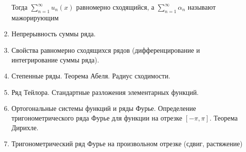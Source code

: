 \documentclass[12pt]{article}
\begin{document}
\begin{enumerate}
    Тогда $\sum_{n = 1}^\infty u_n(x)$ равномерно сходящийся, а $\sum_{n = 1}^\infty \alpha_n$ называют мажорирующим

    \item Непрерывность суммы ряда.
    \item Свойства равномерно сходящихся рядов (дифференцирование и интегрирование суммы
    ряда).
    \item Степенные ряды. Теорема Абеля. Радиус сходимости.
    \item Ряд Тейлора. Стандартные разложения элементарных функций.
    \item Ортогональные системы функций и ряды Фурье. Определение тригонометрического ряда
    Фурье для функции на отрезке $[-\pi, \pi]$. Теорема Дирихле.
    \item Тригонометрический ряд Фурье на произвольном отрезке (сдвиг, растяжение)
\end{enumerate}
\end{document}
